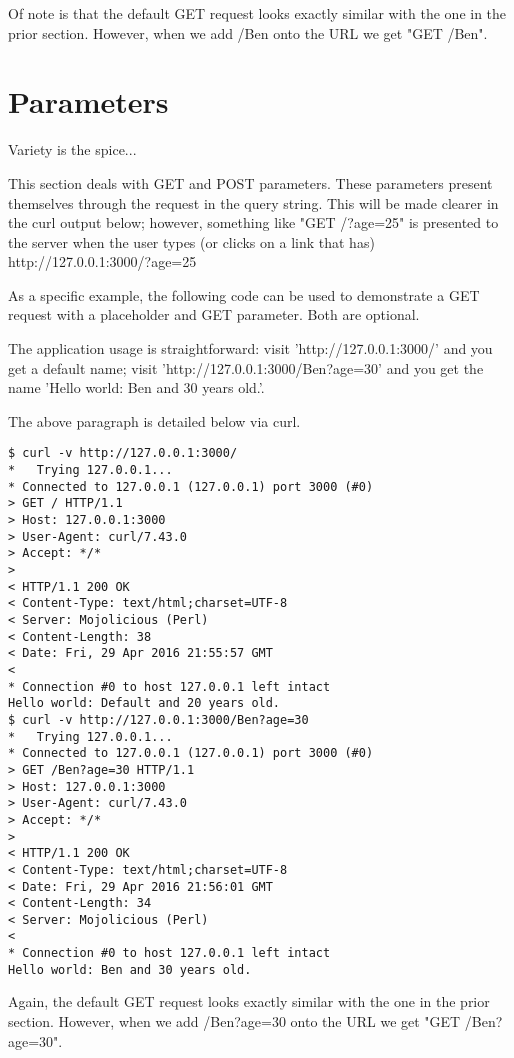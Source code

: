 \documentclass[14pt]{extreport}
\begin{document}
Of note is that the default GET request looks exactly similar with the one in
the prior section.  However, when we add /Ben onto the URL we get "GET /Ben".

\section{Parameters}

{\Large Variety is the spice...}

This section deals with GET and POST parameters.  These parameters present
themselves through the request in the query string.  This will be made clearer
in the curl output below; however, something like "GET /?age=25" is presented
to the server when the user types (or clicks on a link that has)
http://127.0.0.1:3000/?age=25

As a specific example, the following code can be used to demonstrate a GET
request with a placeholder and GET parameter.  Both are optional.



The application usage is straightforward: visit 'http://127.0.0.1:3000/' and
you get a default name; visit 'http://127.0.0.1:3000/Ben?age=30' and you get
the name 'Hello world: Ben and 30 years old.'.

The above paragraph is detailed below via curl.

\clearpage

\begin{lstlisting}[style=BashOutputStyle]
$ curl -v http://127.0.0.1:3000/          
*   Trying 127.0.0.1...
* Connected to 127.0.0.1 (127.0.0.1) port 3000 (#0)
> GET / HTTP/1.1
> Host: 127.0.0.1:3000
> User-Agent: curl/7.43.0
> Accept: */*
> 
< HTTP/1.1 200 OK
< Content-Type: text/html;charset=UTF-8
< Server: Mojolicious (Perl)
< Content-Length: 38
< Date: Fri, 29 Apr 2016 21:55:57 GMT
< 
* Connection #0 to host 127.0.0.1 left intact
Hello world: Default and 20 years old.
$ curl -v http://127.0.0.1:3000/Ben?age=30
*   Trying 127.0.0.1...
* Connected to 127.0.0.1 (127.0.0.1) port 3000 (#0)
> GET /Ben?age=30 HTTP/1.1
> Host: 127.0.0.1:3000
> User-Agent: curl/7.43.0
> Accept: */*
> 
< HTTP/1.1 200 OK
< Content-Type: text/html;charset=UTF-8
< Date: Fri, 29 Apr 2016 21:56:01 GMT
< Content-Length: 34
< Server: Mojolicious (Perl)
< 
* Connection #0 to host 127.0.0.1 left intact
Hello world: Ben and 30 years old.
\end{lstlisting}

Again, the default GET request looks exactly similar with the one in the prior
section.  However, when we add /Ben?age=30 onto the URL we get "GET
/Ben?age=30".
\end{document}
